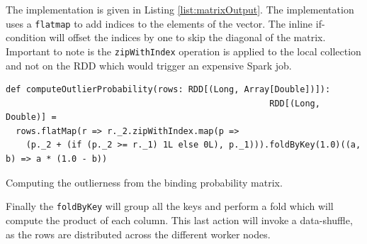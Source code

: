 The implementation is given in Listing \ref{list:matrixOutput}. The implementation uses a \texttt{flatmap} to add indices to the elements of the vector. The inline if-condition will offset the indices by one to skip the diagonal of the matrix. Important to note is the \texttt{zipWithIndex} operation is applied to the local collection and not on the RDD which would trigger an expensive Spark job.

\begin{listing}[ht!]
\begin{verbatim}
def computeOutlierProbability(rows: RDD[(Long, Array[Double])]):
                                                    RDD[(Long, Double)] =
  rows.flatMap(r => r._2.zipWithIndex.map(p =>
    (p._2 + (if (p._2 >= r._1) 1L else 0L), p._1))).foldByKey(1.0)((a, b) => a * (1.0 - b))
\end{verbatim}

\caption{Computing the outlierness from the binding probability matrix.}
\label{list:matrixOutput}
\end{listing}

Finally the \texttt{foldByKey} will group all the keys and perform a fold which will compute the product of each column. This last action will invoke a data-shuffle, as the rows are distributed across the different worker nodes.